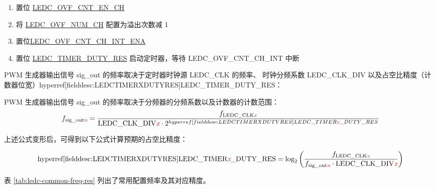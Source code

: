 \documentclass[main\_\_CN.tex]{subfiles}
\begin{document}
 \begin{enumerate}
    \item 置位 \hyperref[fielddesc:LEDCOVFCNTENCHN]{LEDC\_OVF\_CNT\_EN\_CH}
    \item 将 \hyperref[fielddesc:LEDCOVFNUMCHN]{LEDC\_OVF\_NUM\_CH} 配置为溢出次数减 1
    \item 置位\hyperref[fielddesc:LEDCOVFCNTCHNINTENA]{LEDC\_OVF\_CNT\_CH\_INT\_ENA}
    \item 置位 \hyperref[fielddesc:LEDCTIMERXDUTYRES]{LEDC\_TIMER\_DUTY\_RES} 启动定时器，等待 LEDC\_OVF\_CNT\_CH\_INT 中断
\end{enumerate}

PWM 生成器输出信号 sig\_out 的频率取决于定时器时钟源 LEDC\_CLK 的频率、 时钟分频系数 LEDC\_CLK\_DIV 以及占空比精度（计数器位宽）hyperref[fielddesc:LEDCTIMERXDUTYRES]{LEDC\_TIMER\_DUTY\_RES}：

PWM 生成器输出信号 sig\_out 的频率取决于分频器的分频系数以及计数器的计数范围：
    \[
    f_{\textrm{sig\_out\textcolor{red}{\it{n}}}}=\frac{f_{\textrm{LEDC\_CLK\textcolor{red}{\it{x}}}}}
                        {\textrm{LEDC\_CLK\_DIV}\textcolor{red}{\it{x}}\cdot 2^{hyperref[fielddesc:LEDCTIMERXDUTYRES]{LEDC\_TIMER\textcolor{red}{\it{x}}\_DUTY\_RES}}}
    \]

上述公式变形后，可得到以下公式计算预期的占空比精度：

    \[
    \textrm{hyperref[fielddesc:LEDCTIMERXDUTYRES]{LEDC\_TIMER\textcolor{red}{\it{x}}\_DUTY\_RES}}
    =\log_2\left(\frac{f_{\textrm{LEDC\_CLK\textcolor{red}{\it{x}}}}}
    {f_{\textrm{sig\_out\textcolor{red}{\it{n}}}}\cdot \textrm{LEDC\_CLK\_DIV\textcolor{red}{\it{x}}}}\right)
    \]

表 \ref{tab:ledc-common-freq-res} 列出了常用配置频率及其对应精度。
\end{document}
